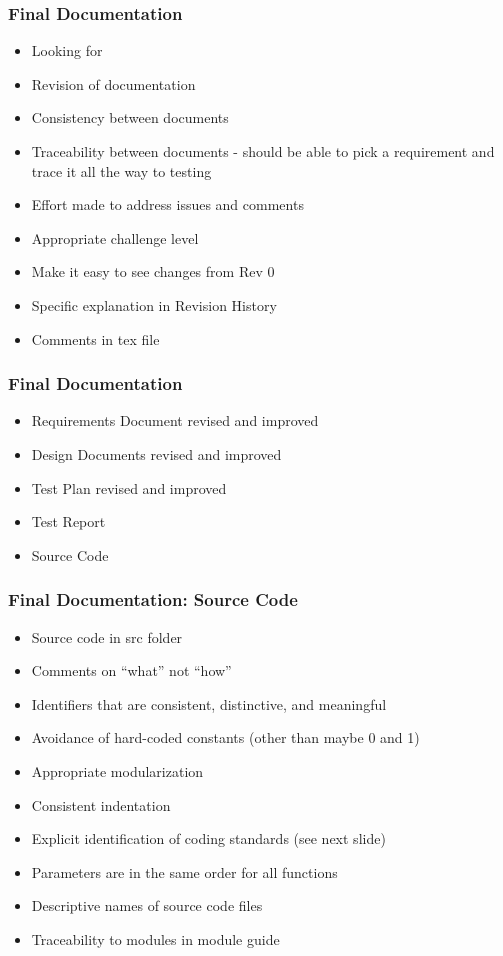 \documentclass[t,12pt,numbers,fleqn]{beamer}
\begin{document}

\begin{frame}
\frametitle{Final Documentation}
\begin{itemize}
\item Looking for 
\bi
\item Revision of documentation
\item Consistency between documents
\item Traceability between documents - should be able to pick a requirement and
  trace it all the way to testing
\item Effort made to address issues and comments
\item Appropriate challenge level
\ei
\item Make it easy to see changes from Rev 0
\bi
\item Specific explanation in Revision History
\item Comments in tex file
\ei
\end{itemize}
\end{frame}


\begin{frame}
\frametitle{Final Documentation}
\begin{itemize}
\item Requirements Document revised and improved
\item Design Documents revised and improved
\item Test Plan revised and improved
\item Test Report
\item Source Code
\end{itemize}
\end{frame}


\begin{frame}
\frametitle{Final Documentation: Source Code}
\begin{itemize}
\item Source code in src folder
\item Comments on ``what'' not ``how''
\item Identifiers that are consistent, distinctive, and meaningful
\item Avoidance of hard-coded constants (other than maybe 0 and 1)
\item Appropriate modularization
\item Consistent indentation
\item Explicit identification of coding standards (see next slide)
\item Parameters are in the same order for all functions
\item Descriptive names of source code files
\item Traceability to modules in module guide
\end{itemize}
\end{frame}
\end{document}
